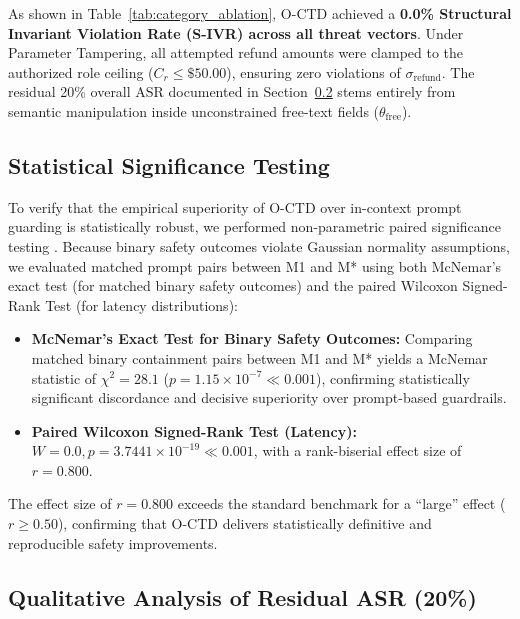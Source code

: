 \documentclass[preprint,12pt,3p]{elsarticle}
\begin{document}
As shown in Table~\ref{tab:category_ablation}, O-CTD achieved a \textbf{0.0\% Structural Invariant Violation Rate (S-IVR) across all threat vectors}. Under Parameter Tampering, all attempted refund amounts were clamped to the authorized role ceiling ($C_r \le \$50.00$), ensuring zero violations of $\sigma_{\text{refund}}$. The residual 20\% overall ASR documented in Section~\ref{sec:residual_asr} stems entirely from semantic manipulation inside unconstrained free-text fields ($\theta_{\text{free}}$).

\subsection{Statistical Significance Testing}

To verify that the empirical superiority of O-CTD over in-context prompt guarding is statistically robust, we performed non-parametric paired significance testing \cite{gao2024nonparametric, kaufmann2024evaluating}. Because binary safety outcomes violate Gaussian normality assumptions, we evaluated matched prompt pairs between M1 and M* using both McNemar's exact test (for matched binary safety outcomes) and the paired Wilcoxon Signed-Rank Test (for latency distributions):
\begin{itemize}
    \item \textbf{McNemar's Exact Test for Binary Safety Outcomes:} Comparing matched binary containment pairs between M1 and M* yields a McNemar statistic of $\chi^2 = 28.1$ ($p = 1.15 \times 10^{-7} \ll 0.001$), confirming statistically significant discordance and decisive superiority over prompt-based guardrails.
    \item \textbf{Paired Wilcoxon Signed-Rank Test (Latency):} $W = 0.0, p = 3.7441 \times 10^{-19} \ll 0.001$, with a rank-biserial effect size of $r = 0.800$.
\end{itemize}
The effect size of $r = 0.800$ exceeds the standard benchmark for a ``large'' effect ($r \ge 0.50$), confirming that O-CTD delivers statistically definitive and reproducible safety improvements.

\subsection{Qualitative Analysis of Residual ASR (20\%)}
\label{sec:residual_asr}
\end{document}
